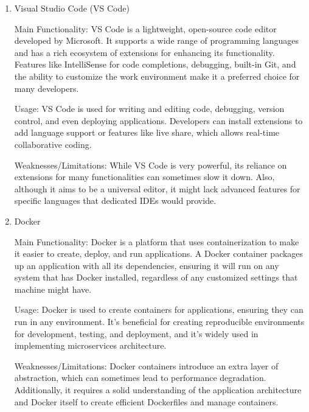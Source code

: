\documentclass[a4paper, 11pt]{report}
\begin{document}
\begin{enumerate}

\item Visual Studio Code (VS Code)

Main Functionality: VS Code is a lightweight, open-source code editor developed by Microsoft. It supports a wide range of programming languages and has a rich ecosystem of extensions for enhancing its functionality. Features like IntelliSense for code completions, debugging, built-in Git, and the ability to customize the work environment make it a preferred choice for many developers.

Usage: VS Code is used for writing and editing code, debugging, version control, and even deploying applications. Developers can install extensions to add language support or features like live share, which allows real-time collaborative coding.

Weaknesses/Limitations: While VS Code is very powerful, its reliance on extensions for many functionalities can sometimes slow it down. Also, although it aims to be a universal editor, it might lack advanced features for specific languages that dedicated IDEs would provide.

\item Docker

Main Functionality: Docker is a platform that uses containerization to make it easier to create, deploy, and run applications. A Docker container packages up an application with all its dependencies, ensuring it will run on any system that has Docker installed, regardless of any customized settings that machine might have.

Usage: Docker is used to create containers for applications, ensuring they can run in any environment. It's beneficial for creating reproducible environments for development, testing, and deployment, and it's widely used in implementing microservices architecture.

Weaknesses/Limitations: Docker containers introduce an extra layer of abstraction, which can sometimes lead to performance degradation. Additionally, it requires a solid understanding of the application architecture and Docker itself to create efficient Dockerfiles and manage containers.
\end{enumerate}
\end{document}

